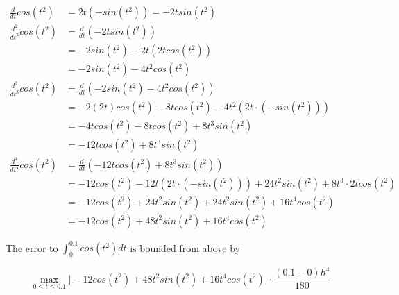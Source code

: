 \documentclass[9pt]{article}
\begin{document}
\begin{align*}
  \frac{d}{dt}cos(t^2) &= 2t(-sin(t^2)) = -2tsin(t^2) \\
  \frac{d^2}{dt^2}cos(t^2) &= \frac{d}{dt}(-2tsin(t^2)) \\
  &= -2sin(t^2) - 2t(2tcos(t^2)) \\
  &= -2sin(t^2) - 4t^2cos(t^2) \\
  \frac{d^3}{dt^3}cos(t^2) &= \frac{d}{dt}(-2sin(t^2) - 4t^2cos(t^2)) \\
  &= -2(2t)cos(t^2) - 8tcos(t^2) - 4t^2(2t \cdot (-sin(t^2))) \\
  &= -4tcos(t^2) - 8tcos(t^2) + 8t^3sin(t^2) \\
  &= -12tcos(t^2) + 8t^3sin(t^2) \\
  \frac{d^4}{dt^4}cos(t^2) &= \frac{d}{dt}(-12tcos(t^2) + 8t^3sin(t^2)) \\
  &= -12cos(t^2) - 12t(2t \cdot (-sin(t^2))) + 24t^2 sin(t^2) + 8t^3 \cdot 2tcos(t^2) \\
  &= -12cos(t^2) + 24t^2sin(t^2) + 24t^2sin(t^2) + 16t^4cos(t^2) \\
  &= -12cos(t^2) + 48t^2sin(t^2) + 16t^4cos(t^2)
\end{align*}

The error to $\int_0^{0.1} cos(t^2) dt$ is bounded from above by

\begin{equation*}
\max_{0 \leq t \leq 0.1} \Big| -12cos(t^2) + 48t^2sin(t^2) + 16t^4cos(t^2) \Big| \cdot \frac{(0.1 - 0)h^4}{180}
\end{equation*}
\end{document}

